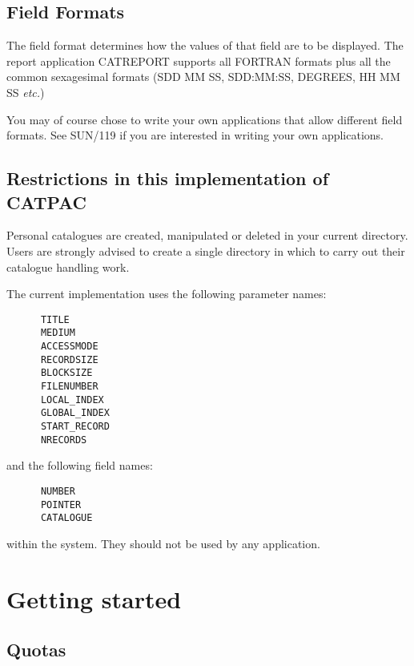\subsection {Field Formats}
 
The field format determines how the values of that field are to be displayed.
The report application CATREPORT supports all FORTRAN formats plus all the 
common sexagesimal formats (SDD MM SS, SDD:MM:SS, DEGREES, HH MM SS 
{\em etc.})

You may of course chose to write your own applications that allow different 
field formats. See SUN/119 if you are interested in writing your own
applications.

\subsection {Restrictions in this implementation of CATPAC}

Personal catalogues are created, manipulated or deleted in your current
directory. Users are strongly advised to create a single directory in which to
carry out their catalogue handling work.

The current implementation uses the following parameter names:

\begin{small}
\begin{verbatim}
      TITLE
      MEDIUM
      ACCESSMODE
      RECORDSIZE
      BLOCKSIZE
      FILENUMBER
      LOCAL_INDEX
      GLOBAL_INDEX
      START_RECORD
      NRECORDS
\end{verbatim}
\end{small}

and the following field names:

\begin{small}
\begin{verbatim}
      NUMBER
      POINTER    
      CATALOGUE
\end{verbatim}
\end{small}

within the system. They should not be used by any application.

\section{Getting started}

\subsection{Quotas}

